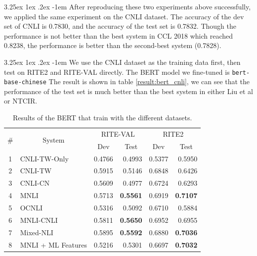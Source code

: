 \documentclass[12pt]{article}
\makeatletter
\renewcommand\paragraph{\@startsection{paragraph}{5}{\z@}%
  {3.25ex \@plus1ex \@minus.2ex}%
  {-1em}%
  {\normalfont\normalsize\bfseries}}
\makeatother
\begin{document}
\begin{CJK*}{UTF8}{bkai}
\begin{spacing}{1.77}
\paragraph{}
After reproducing these two experiments above successfully, we applied the same experiment on the CNLI dataset. The accuracy of the dev set of CNLI is 0.7830, and the accuracy of the test set is 0.7832. Though the performance is not better than the best system in CCL 2018 which reached 0.8238, the performance is better than the second-best system (0.7828).

\paragraph{}
We use the CNLI dataset as the training data first, then test on RITE2 and RITE-VAL directly. The BERT model we fine-tuned is \texttt{bert-base-chinese} The result is shown in table \ref{result:bert_cnli}, we can see that the performance of the test set is much better than the best system in either Liu et al or NTCIR.

\begin{table}[H]
  \centering
  \setlength{\extrarowheight}{-3pt}
  \begin{tabular}{|c|l|r|r|r|r|}
  \hline
  \multirow{2}{*}{\#} & \multicolumn{1}{c|}{\multirow{2}{*}{System}} & \multicolumn{2}{c|}{RITE-VAL} & \multicolumn{2}{c|}{RITE2} \\ \cline{3-6}
   & \multicolumn{1}{c|}{} & \multicolumn{1}{c|}{Dev} & \multicolumn{1}{c|}{Test} & \multicolumn{1}{c|}{Dev} & \multicolumn{1}{c|}{Test} \\ \hline
  1 & CNLI-TW-Only & 0.4766 & 0.4993 & 0.5377 & 0.5950 \\ \hline
  2 & CNLI-TW & 0.5915 & 0.5146 & 0.6848 & 0.6426 \\ \hline
  3 & CNLI-CN & 0.5609 & 0.4977 & 0.6724 & 0.6293 \\ \hline
  4 & MNLI & 0.5713 & \textbf{0.5561} & 0.6919 & \textbf{0.7107} \\ \hline
  5 & OCNLI & 0.5316 & 0.5092 & 0.6710 & 0.5884 \\ \hline
  6 & MNLI-CNLI & 0.5811 & \textbf{0.5650} & 0.6952 & 0.6955 \\ \hline
  7 & Mixed-NLI & 0.5895 & \textbf{0.5592} & 0.6880 & \textbf{0.7036} \\ \hline
  8 & MNLI + ML Features & 0.5216 & 0.5301 & 0.6697 & \textbf{0.7032} \\ \hline
  \end{tabular}
  \caption{Results of the BERT that train with the different datasets.}
  \label{result:bert_compare}
\end{table}


\end{spacing}
\end{CJK*}
\end{document}
